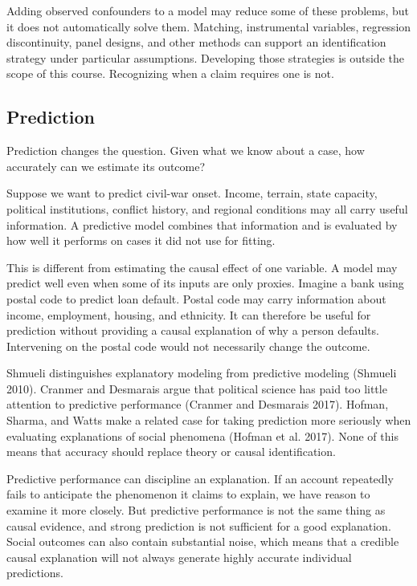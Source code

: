 \documentclass[
  a4paper,
]{scrbook}
\begin{document}
Adding observed confounders to a model may reduce some of these
problems, but it does not automatically solve them. Matching,
instrumental variables, regression discontinuity, panel designs, and
other methods can support an identification strategy under particular
assumptions. Developing those strategies is outside the scope of this
course. Recognizing when a claim requires one is not.

\subsection{Prediction}\label{prediction}

Prediction changes the question. Given what we know about a case, how
accurately can we estimate its outcome?

Suppose we want to predict civil-war onset. Income, terrain, state
capacity, political institutions, conflict history, and regional
conditions may all carry useful information. A predictive model combines
that information and is evaluated by how well it performs on cases it
did not use for fitting.

This is different from estimating the causal effect of one variable. A
model may predict well even when some of its inputs are only proxies.
Imagine a bank using postal code to predict loan default. Postal code
may carry information about income, employment, housing, and ethnicity.
It can therefore be useful for prediction without providing a causal
explanation of why a person defaults. Intervening on the postal code
would not necessarily change the outcome.

Shmueli distinguishes explanatory modeling from predictive modeling
(Shmueli 2010). Cranmer and Desmarais argue that political science has
paid too little attention to predictive performance (Cranmer and
Desmarais 2017). Hofman, Sharma, and Watts make a related case for
taking prediction more seriously when evaluating explanations of social
phenomena (Hofman et al. 2017). None of this means that accuracy should
replace theory or causal identification.

Predictive performance can discipline an explanation. If an account
repeatedly fails to anticipate the phenomenon it claims to explain, we
have reason to examine it more closely. But predictive performance is
not the same thing as causal evidence, and strong prediction is not
sufficient for a good explanation. Social outcomes can also contain
substantial noise, which means that a credible causal explanation will
not always generate highly accurate individual predictions.
\end{document}
